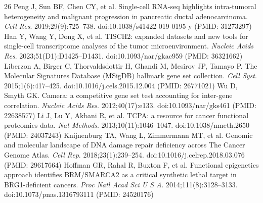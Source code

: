 \documentclass[11pt]{article}
\begin{document}
\begin{thebibliography}{26}
 Peng J, Sun BF, Chen CY, et al. Single-cell RNA-seq highlights intra-tumoral heterogeneity and malignant progression in pancreatic ductal adenocarcinoma. \textit{Cell Res}. 2019;29(9):725--738. doi:10.1038/s41422-019-0195-y (PMID: 31273297)
 Han Y, Wang Y, Dong X, et al. TISCH2: expanded datasets and new tools for single-cell transcriptome analyses of the tumor microenvironment. \textit{Nucleic Acids Res}. 2023;51(D1):D1425--D1431. doi:10.1093/nar/gkac959 (PMID: 36321662)
 Liberzon A, Birger C, Thorvaldsdottir H, Ghandi M, Mesirov JP, Tamayo P. The Molecular Signatures Database (MSigDB) hallmark gene set collection. \textit{Cell Syst}. 2015;1(6):417--425. doi:10.1016/j.cels.2015.12.004 (PMID: 26771021)
 Wu D, Smyth GK. Camera: a competitive gene set test accounting for inter-gene correlation. \textit{Nucleic Acids Res}. 2012;40(17):e133. doi:10.1093/nar/gks461 (PMID: 22638577)
 Li J, Lu Y, Akbani R, et al. TCPA: a resource for cancer functional proteomics data. \textit{Nat Methods}. 2013;10(11):1046--1047. doi:10.1038/nmeth.2650 (PMID: 24037243)
 Knijnenburg TA, Wang L, Zimmermann MT, et al. Genomic and molecular landscape of DNA damage repair deficiency across The Cancer Genome Atlas. \textit{Cell Rep}. 2018;23(1):239--254. doi:10.1016/j.celrep.2018.03.076 (PMID: 29617664)
 Hoffman GR, Rahal R, Buxton F, et al. Functional epigenetics approach identifies BRM/SMARCA2 as a critical synthetic lethal target in BRG1-deficient cancers. \textit{Proc Natl Acad Sci U S A}. 2014;111(8):3128--3133. doi:10.1073/pnas.1316793111 (PMID: 24520176)
\end{thebibliography}
\end{document}
